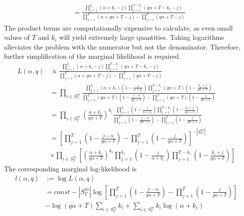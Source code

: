 \documentclass[a4paper, 12pt]{article}
\begin{document}
\begin{itemize}
\begin{align*}
        &= \frac{\prod_{j=1}^{k_i} (\alpha + k_i - j)\prod_{j=1}^{T - k_i} (q\alpha + T - k_i - j)}{\prod_{j=1}^T(\alpha + q\alpha + T - j) - \prod_{j=1}^T (q\alpha + T - j)} 
    \end{align*}
    The product terms are computationally expensive to calculate, as even small values of $T$ and $k_i$ will yield extremely large quantities. Taking logarithms alleviates the problem with the numerator but not the denominator. Therefore, further simplification of the marginal likelihood is required.
    \begin{align} \label{eq:4}
        L(\alpha, q) &\propto \frac{\prod_{j=1}^{k_i} (\alpha + k_i - j)\prod_{j=1}^{T - k_i} (q\alpha + T - k_i - j)}{\prod_{j=1}^T(\alpha + q\alpha + T - j) - \prod_{j=1}^T (q\alpha + T - j)} \nonumber \\
        &= \prod_{i \in S_T^{in}} \frac{\prod_{j=1}^{k_i} (\alpha + k_i)(1 - \frac{j}{\alpha + k_i}) \prod_{j=1}^{T - k_i} (q\alpha + T)(1 - \frac{k_i + j}{q\alpha + T})}{\prod_{j=1}^T (q\alpha + T)(1 -\frac{j - \alpha}{q\alpha + T}) - \prod_{j=1}^T (q\alpha + T)(1 - \frac{j}{q\alpha + T} )} \nonumber \\
        &= \prod_{i \in S_T^{in}} \left(\frac{\alpha + k_i}{q\alpha + T}\right)^{k_i} \frac{\prod_{j=1}^{k_i} (1 - \frac{j}{\alpha + k_i}) \prod_{j=1}^{T - k_i} (1 - \frac{k_i + j}{q\alpha + T})}{\prod_{j=1}^T (1 -\frac{j - \alpha}{q\alpha + T}) - \prod_{j=1}^T (1 - \frac{j}{q\alpha + T} )} \nonumber \\
        &= \left[\prod_{j=1}^T \left(1 -\frac{j - \alpha}{q\alpha + T}\right) - \prod_{j=1}^T \left(1 - \frac{j}{q\alpha + T}\right)\right]^{-|S_T^{in}|} \nonumber \\
        &\times \prod_{i \in S_T^{in}} \left[\left(\frac{\alpha + k_i}{q\alpha + T}\right)^{k_i} \prod_{j=1}^{k_i}  \left(1 - \frac{j}{\alpha + k_i}\right) \prod_{j=1}^{T - k_i} \left(1 - \frac{k_i + j}{q\alpha + T}\right) \right]
    \end{align}
    The corresponding marginal log-likelihood is
    \begin{align} \label{eq:5}
        l(\alpha, q) &:= \log L(\alpha, q) \nonumber \\
        &= const - |S_T^{in}|\log\left[\prod_{j=1}^T (1 - \frac{j - \alpha}{q\alpha + T}) - \prod_{j=1}^T (1 - \frac{j}{q\alpha + T})\right] \nonumber \\
        &- \log(q\alpha + T) \sum_{i \in S_T^{in}} k_i + \sum_{i \in S_T^{in}} k_i\log(\alpha + k_i) \nonumber \\

\end{align}
\end{itemize}
\end{document}
